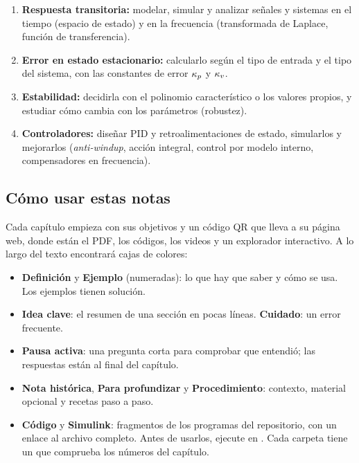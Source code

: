 \begin{receta}
\begin{enumerate}
  \item \textbf{Respuesta transitoria:} modelar, simular y analizar señales y sistemas en el tiempo (espacio de estado) y en la frecuencia (transformada de Laplace, función de transferencia).
  \item \textbf{Error en estado estacionario:} calcularlo según el tipo de entrada y el tipo del sistema, con las constantes de error $\kappa_p$ y $\kappa_v$.
  \item \textbf{Estabilidad:} decidirla con el polinomio característico o los valores propios, y estudiar cómo cambia con los parámetros (robustez).
  \item \textbf{Controladores:} diseñar PID y retroalimentaciones de estado, simularlos y mejorarlos (\emph{anti-windup}, acción integral, control por modelo interno, compensadores en frecuencia).
\end{enumerate}
\end{receta}

\subsection{Cómo usar estas notas}

Cada capítulo empieza con sus objetivos y un código QR que lleva a su página web, donde están el PDF, los códigos, los videos y un explorador interactivo. A lo largo del texto encontrará cajas de colores:

\begin{itemize}
  \item \textbf{Definición} y \textbf{Ejemplo} (numeradas): lo que hay que saber y cómo se usa. Los ejemplos tienen solución.
  \item \textbf{Idea clave}: el resumen de una sección en pocas líneas. \textbf{Cuidado}: un error frecuente.
  \item \textbf{Pausa activa}: una pregunta corta para comprobar que entendió; las respuestas están al final del capítulo.
  \item \textbf{Nota histórica}, \textbf{Para profundizar} y \textbf{Procedimiento}: contexto, material opcional y recetas paso a paso.
  \item \textbf{Código} y \textbf{Simulink}: fragmentos de los programas del repositorio, con un enlace al archivo completo. Antes de usarlos, ejecute  en \matlab. Cada carpeta tiene un  que comprueba los números del capítulo.
\end{itemize}

